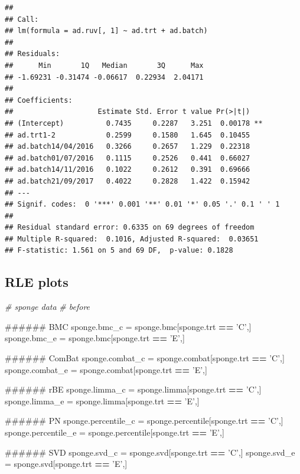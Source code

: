 \documentclass[]{book}
\newenvironment{Shaded}{\begin{snugshade}}{\end{snugshade}}
\newcommand{\StringTok}[1]{\textcolor[rgb]{0.31,0.60,0.02}{#1}}
\newcommand{\CommentTok}[1]{\textcolor[rgb]{0.56,0.35,0.01}{\textit{#1}}}
\newcommand{\OperatorTok}[1]{\textcolor[rgb]{0.81,0.36,0.00}{\textbf{#1}}}
\newcommand{\NormalTok}[1]{#1}
\begin{document}
\begin{verbatim}
## 
## Call:
## lm(formula = ad.ruv[, 1] ~ ad.trt + ad.batch)
## 
## Residuals:
##      Min       1Q   Median       3Q      Max 
## -1.69231 -0.31474 -0.06617  0.22934  2.04171 
## 
## Coefficients:
##                    Estimate Std. Error t value Pr(>|t|)   
## (Intercept)          0.7435     0.2287   3.251  0.00178 **
## ad.trt1-2            0.2599     0.1580   1.645  0.10455   
## ad.batch14/04/2016   0.3266     0.2657   1.229  0.22318   
## ad.batch01/07/2016   0.1115     0.2526   0.441  0.66027   
## ad.batch14/11/2016   0.1022     0.2612   0.391  0.69666   
## ad.batch21/09/2017   0.4022     0.2828   1.422  0.15942   
## ---
## Signif. codes:  0 '***' 0.001 '**' 0.01 '*' 0.05 '.' 0.1 ' ' 1
## 
## Residual standard error: 0.6335 on 69 degrees of freedom
## Multiple R-squared:  0.1016, Adjusted R-squared:  0.03651 
## F-statistic: 1.561 on 5 and 69 DF,  p-value: 0.1828
\end{verbatim}

\subsection{RLE plots}\label{rle-plots-1}

\begin{Shaded}
\begin{Highlighting}[]
\CommentTok{# sponge data}
\CommentTok{# before}

\NormalTok{###### BMC}
\NormalTok{sponge.bmc_c =}\StringTok{ }\NormalTok{sponge.bmc[sponge.trt }\OperatorTok{==}\StringTok{ 'C'}\NormalTok{,]}
\NormalTok{sponge.bmc_e =}\StringTok{ }\NormalTok{sponge.bmc[sponge.trt }\OperatorTok{==}\StringTok{ 'E'}\NormalTok{,] }

\NormalTok{###### ComBat}
\NormalTok{sponge.combat_c =}\StringTok{ }\NormalTok{sponge.combat[sponge.trt }\OperatorTok{==}\StringTok{ 'C'}\NormalTok{,]}
\NormalTok{sponge.combat_e =}\StringTok{ }\NormalTok{sponge.combat[sponge.trt }\OperatorTok{==}\StringTok{ 'E'}\NormalTok{,] }

\NormalTok{###### rBE}
\NormalTok{sponge.limma_c =}\StringTok{ }\NormalTok{sponge.limma[sponge.trt }\OperatorTok{==}\StringTok{ 'C'}\NormalTok{,]}
\NormalTok{sponge.limma_e =}\StringTok{ }\NormalTok{sponge.limma[sponge.trt }\OperatorTok{==}\StringTok{ 'E'}\NormalTok{,] }

\NormalTok{###### PN}
\NormalTok{sponge.percentile_c =}\StringTok{ }\NormalTok{sponge.percentile[sponge.trt }\OperatorTok{==}\StringTok{ 'C'}\NormalTok{,]}
\NormalTok{sponge.percentile_e =}\StringTok{ }\NormalTok{sponge.percentile[sponge.trt }\OperatorTok{==}\StringTok{ 'E'}\NormalTok{,] }

\NormalTok{###### SVD}
\NormalTok{sponge.svd_c =}\StringTok{ }\NormalTok{sponge.svd[sponge.trt }\OperatorTok{==}\StringTok{ 'C'}\NormalTok{,]}
\NormalTok{sponge.svd_e =}\StringTok{ }\NormalTok{sponge.svd[sponge.trt }\OperatorTok{==}\StringTok{ 'E'}\NormalTok{,] }
\end{Highlighting}
\end{Shaded}
\end{document}
